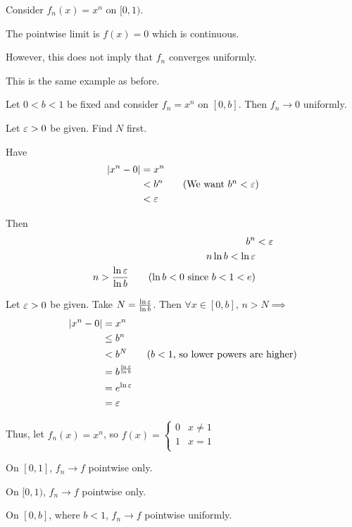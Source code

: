 \documentclass{article}
\begin{document}
\begin{example}
  Consider $f_n(x) = x^n$ on $[0, 1)$.

  The pointwise limit is $f(x) = 0$ which is continuous.

  However, this does not imply that $f_n$ converges uniformly.

  This is the same example as before.
\end{example}
\begin{example}
  Let $0 < b < 1$ be fixed and consider $f_n = x^n$ on $[0, b]$. Then $f_n \to 0$ uniformly.

  Let $\varepsilon > 0$ be given. Find $N$ first.

  Have
  \begin{align*}
    \abs{x^n - 0} &= x^n\\
    &< b^n \tag{We want $b^n < \ep$}\\
    &< \ep
  \end{align*}

  Then
  \begin{align*}
    b^n &< \varepsilon\\
    n \ln b < \ln \varepsilon\\
    n > \frac{\ln \varepsilon}{\ln b} \tag{$\ln b < 0$ since $b < 1 < e$}\\
  \end{align*}

  Let $\varepsilon > 0$ be given. Take $N = \frac{\ln \varepsilon}{\ln b}$. Then $\forall x \in [0, b]$, $n > N \implies$
  \begin{align*}
    \abs{x^n - 0} &= x^n\\
    &\leq b^n\\
    &< b^N \tag{$b < 1$, so lower powers are higher}\\
    &= b^{\frac{\ln \varepsilon}{\ln b}}\\
    &= e^{\ln \varepsilon}\\
    &= \varepsilon
  \end{align*}

  Thus, let $f_n(x) = x^n$, so $f(x) =
  \begin{cases}
    0 & x \neq 1\\
    1 & x = 1\\
  \end{cases}$

  On $[0, 1]$, $f_n \to f$ pointwise only.

  On $[0, 1)$, $f_n \to f$ pointwise only.

  On $[0, b]$, where $b < 1$, $f_n \to f$ pointwise uniformly.
\end{example}
\end{document}
